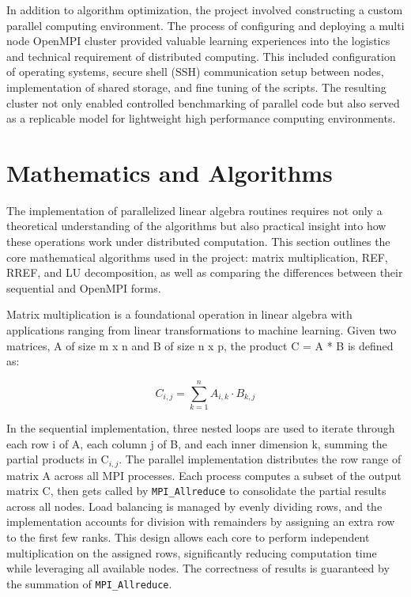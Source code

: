 \documentclass[12pt]{article}
\begin{document}
In addition to algorithm optimization, the project involved constructing a custom parallel computing environment. The process of configuring and deploying a multi node OpenMPI cluster provided valuable learning experiences into the logistics and technical requirement of distributed computing. This included configuration of operating systems, secure shell (SSH) communication setup between nodes, implementation of shared storage, and fine tuning of the scripts. The resulting cluster not only enabled controlled benchmarking of parallel code but also served as a replicable model for lightweight high performance computing environments.

\section{Mathematics and Algorithms}
The implementation of parallelized linear algebra routines requires not only a theoretical understanding of the algorithms but also practical insight into how these operations work under distributed computation. This section outlines the core mathematical algorithms used in the project: matrix multiplication, REF, RREF, and LU decomposition, as well as comparing the differences between their sequential and OpenMPI forms.

Matrix multiplication is a foundational operation in linear algebra with applications ranging from linear transformations to machine learning. Given two matrices, A of size m x n and B of size n x p, the product C = A * B is defined as:

\[
    C_{i,j} = \sum_{k=1}^{n} A_{i,k} \cdot B_{k,j}
\]

In the sequential implementation, three nested loops are used to iterate through each row i of A, each column j of B, and each inner dimension k, summing the partial products in C\(_{i,j}\). The parallel implementation distributes the row range of matrix A across all MPI processes. Each process computes a subset of the output matrix C, then gets called by \texttt{MPI\_Allreduce} to consolidate the partial results across all nodes. Load balancing is managed by evenly dividing rows, and the implementation accounts for division with remainders by assigning an extra row to the first few ranks. This design allows each core to perform independent multiplication on the assigned rows, significantly reducing computation time while leveraging all available nodes. The correctness of results is guaranteed by the summation of \texttt{MPI\_Allreduce}.
\end{document}
